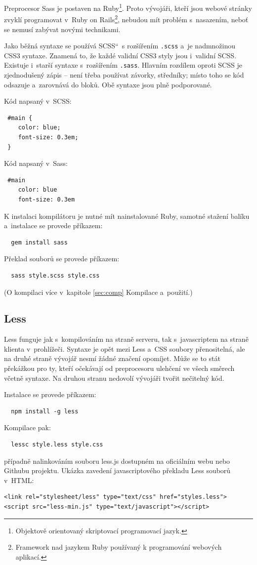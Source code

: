 \documentclass[thesis=B,czech]{FITthesis}[2012/06/26]
\begin{document}
Preprocesor Sass je postaven na Ruby\footnote{Objektově orientovaný skriptovací programovací jazyk.}. Proto vývojáři, kteří jsou webové stránky zvyklí programovat v~Ruby on Rails\footnote{Framework nad jazykem Ruby používaný k programování webových aplikací.}, nebudou mít problém s~nasazením, neboť se nemusí zabývat novými technikami. 

Jako běžná syntaxe se používá \quotedblbase SCSS\textquotedblleft   ~s rozšířením \verb#.scss# a~je nadmnožinou CSS3 syntaxe. Znamená to, že každé validní CSS3 styly jsou i~validní SCSS. Existuje i~starší syntaxe s~rozšířením \verb#.sass#. Hlavním rozdílem oproti SCSS je zjednodušený zápis -- není třeba používat závorky, středníky; místo toho se kód odsazuje a~zarovnává do bloků. Obě syntaxe jsou plně podporované.

\noindent Kód napsaný v~SCSS:
\scriptsize
\begin{verbatim}
 #main {
    color: blue;
    font-size: 0.3em;
 }
\end{verbatim}
\normalsize
Kód napsaný v~Sass:
\scriptsize
\begin{verbatim}
 #main
    color: blue
    font-size: 0.3em
\end{verbatim}
\normalsize
K instalaci kompilátoru je nutné mít nainstalované Ruby, samotné stažení balíku a~instalace se provede příkazem:
\scriptsize
\begin{verbatim}
  gem install sass
\end{verbatim}
\normalsize
Překlad souborů se provede příkazem:
\scriptsize
\begin{verbatim}
  sass style.scss style.css
\end{verbatim}
\normalsize
(O kompilaci více v~kapitole \ref{sec:comp} Kompilace a~použití.)

\subsection{Less}

Less funguje jak s~kompilováním na straně serveru, tak s~javascriptem na straně klienta v~prohlížeči. Syntaxe je opět mezi Less a~CSS soubory přenositelná, ale na druhé straně vývojář nesmí žádné značení opomíjet. Může se to stát překážkou pro ty, kteří očekávají od preprocesoru ulehčení ve všech směrech včetně syntaxe. Na druhou stranu nedovolí vývojáři tvořit nečitelný kód.

\noindent Instalace se provede příkazem:
\scriptsize
\begin{verbatim}
  npm install -g less
\end{verbatim}
\normalsize
Kompilace pak:
\scriptsize
\begin{verbatim}
  lessc style.less style.css 
\end{verbatim}
\normalsize
případně nalinkováním souboru less.js dostupném na  oficiálním webu nebo Githubu projektu. Ukázka zavedení javascriptového překladu Less souborů v~HTML:
\scriptsize
\begin{verbatim}
<link rel="stylesheet/less" type="text/css" href="styles.less">
<script src="less-min.js" type="text/javascript"></script>
\end{verbatim}
\normalsize
\end{document}
